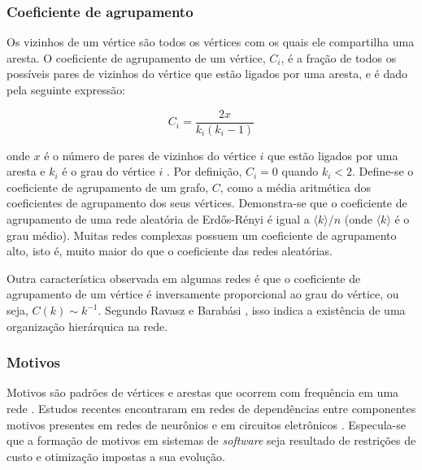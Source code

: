 \documentclass{article}
\begin{document}


\subsubsection{Coeficiente de agrupamento}

Os vizinhos de um vértice são todos os vértices com os quais ele compartilha uma aresta. O coeficiente de agrupamento de um vértice, $C_i$, é a fração de todos os possíveis pares de vizinhos do vértice que estão ligados por uma aresta, e é dado pela seguinte expressão:

\[  C_i = \frac{2x}{k_i(k_i - 1)} \]

onde $x$ é o número de pares de vizinhos do vértice $i$ que estão ligados por uma aresta e $k_i$ é o grau do vértice $i$ \cite{Watts1998}. Por definição, $C_i = 0$ quando $k_i < 2$. Define-se o coeficiente de agrupamento de um grafo, $C$, como a média aritmética dos coeficientes de agrupamento dos seus vértices. Demonstra-se que o coeficiente de agrupamento de uma rede aleatória de Erdős-Rényi é igual a $\langle k \rangle / n$ (onde $\langle k \rangle$ é o grau médio). Muitas redes complexas possuem um coeficiente de agrupamento alto, isto é, muito maior do que o coeficiente das redes aleatórias.

Outra característica observada em algumas redes é que o coeficiente de agrupamento de um vértice é inversamente proporcional ao grau do vértice, ou seja, $C(k) \sim k^{-1}$. Segundo Ravasz e Barabási \cite{Ravasz2003}, isso indica a existência de uma organização hierárquica na rede.

\subsubsection{Motivos}

Motivos são padrões de vértices e arestas que ocorrem com frequência em uma rede \cite{Milo2002}. Estudos recentes encontraram em redes de dependências entre componentes motivos presentes em redes de neurônios e em circuitos eletrônicos \cite{Valverde2005,Ma2008}. Especula-se que a formação de motivos em sistemas de \textit{software} seja resultado de restrições de custo e otimização impostas a sua evolução.
\end{document}
